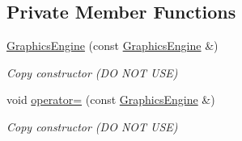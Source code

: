 \subsection*{Private Member Functions}
\begin{DoxyCompactItemize}
\item 
\hyperlink{classGraphicsEngine_a6b6f92b943fc986f687b4d7797f2fa2a}{Graphics\-Engine} (const \hyperlink{classGraphicsEngine}{Graphics\-Engine} \&)
\begin{DoxyCompactList}\small\item\em Copy constructor (D\-O N\-O\-T U\-S\-E) \end{DoxyCompactList}\item 
void \hyperlink{classGraphicsEngine_af942976c09aac7332c8425b6a0130688}{operator=} (const \hyperlink{classGraphicsEngine}{Graphics\-Engine} \&)
\begin{DoxyCompactList}\small\item\em Copy constructor (D\-O N\-O\-T U\-S\-E) \end{DoxyCompactList}\end{DoxyCompactItemize}
